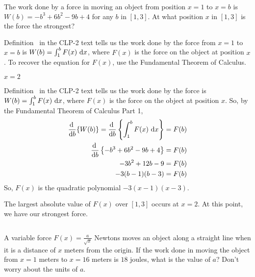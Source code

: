 \begin{Mquestion}
The work done by a force in moving an object from position $x = 1$ to $x = b$ is
$W(b) = -b^3+6b^2-9b+4$
for any $b$ in $[1,3]$. At what position $x$ in $[1,3]$ is the force the strongest?
\end{Mquestion}
\begin{hint}
Definition~ in the CLP-2 text tells us the work done by the force from $x=1$ to $x=b$ is
$W(b) = \int_1^b F(x)~\mathrm{d}x$, where $F(x)$ is the force on the object at position $x$. To recover the equation for $F(x)$, use the Fundamental Theorem of Calculus.
\end{hint}
\begin{answer}
$x=2$
\end{answer}
\begin{solution}
Definition~ in the CLP-2 text tells us the work done by the force is
$W(b) = \int_1^b F(x)~\mathrm{d}x$, where $F(x)$ is the force on the object at position $x$.
So, by the Fundamental Theorem of Calculus Part 1,
\begin{align*}
\diff{}{b}\{W(b)\} = \diff{}{b}\left\{\int_1^b F(x)~\dee{x}\right\} &= F(b)\\
\diff{}{b}\left\{-b^3+6b^2-9b+4\right\}&=F(b)\\
-3b^2+12b-9&=F(b)\\
-3(b-1)(b-3)&=F(b)
\end{align*}
So, $F(x)$ is the quadratic polynomial $-3(x-1)(x-3)$.
\begin{center}
\end{center}
The largest absolute value of $F(x)$ over $[1,3]$ occurs at $x=2$.  At this point, we have our strongest force.
\end{solution}


\subsection*{\Procedural}





\begin{question}[2014D]
A variable force $F(x) = \frac{a}{\sqrt{x}}$ Newtons moves an object
along a straight line when it is a distance of $x$ meters from the origin.
If the work done in moving the object from $x = 1$ meters to
$x = 16$ meters is $18$ joules, what is the value of $a$? Don't worry
about the units of $a$.
\end{question}

